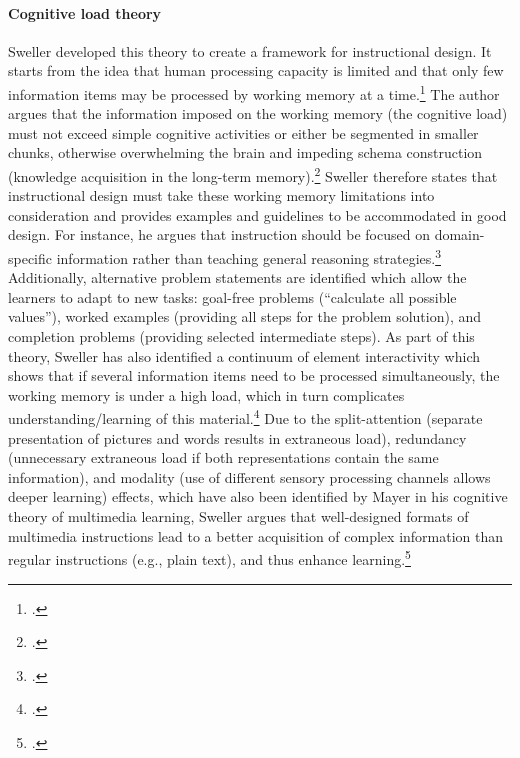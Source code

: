 \paragraph{Cognitive load theory} Sweller developed this theory to create a framework for instructional design. It starts from the idea that human processing capacity is limited and that only few information items may be processed by working memory at a time.\footcites[Cf.][p.250]{SwellerCognitiveArchitectureInstructional1998}[cf.][p.490]{Gervenefficiencymultimedialearning2003} The author argues that the information imposed on the working memory (the cognitive load) must not exceed simple cognitive activities or either be segmented in smaller chunks, otherwise overwhelming the brain and impeding schema construction (knowledge acquisition in the long-term memory).\footcites[Cf.][p.255 et seqq]{SwellerCognitiveArchitectureInstructional1998}[cf.][p.2]{SwellerVisualisationInstructionalDesign2002}[cf.][p.562]{Gervenefficiencymultimedialearning2003} Sweller therefore states that instructional design must take these working memory limitations into consideration and provides examples and guidelines to be accommodated in good design. For instance, he argues that instruction should be focused on domain-specific information rather than teaching general reasoning strategies.\footcites[Cf.][p.255]{SwellerCognitiveArchitectureInstructional1998}[cf.][p.301]{SwellerCognitiveloadtheory1994} Additionally, alternative problem statements are identified which allow the learners to adapt to new tasks: goal-free problems (\enquote{calculate all possible values}), worked examples (providing all steps for the problem solution), and completion problems (providing selected intermediate steps).
As part of this theory, Sweller has also identified a continuum of element interactivity which shows that if several information items need to be processed simultaneously, the working memory is under a high load, which in turn complicates understanding/learning of this material.\footcites[Cf.][p.261]{SwellerCognitiveArchitectureInstructional1998} Due to the split-attention (separate presentation of pictures and words results in extraneous load), redundancy (unnecessary extraneous load if both representations contain the same information), and modality (use of different sensory processing channels allows deeper learning) effects, which have also been identified by Mayer in his cognitive theory of multimedia learning, Sweller argues that well-designed formats of multimedia instructions lead to a better acquisition of complex information than regular instructions (e.g., plain text), and thus enhance learning.\footcites[Cf.][p.4]{PaasCognitiveLoadTheory2004}

